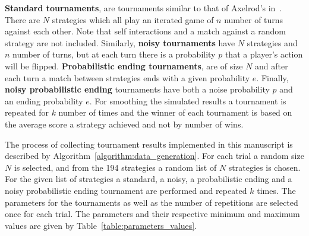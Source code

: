 \documentclass{article}
\begin{document}
\textbf{Standard tournaments}, are tournaments similar to that of Axelrod's
in~\cite{Axelrod1980a}. There are \(N\) strategies which all play an iterated
game of \(n\) number of turns against each other. Note that self interactions
and a match against a random strategy are not included. Similarly, \textbf{noisy
tournaments} have \(N\) strategies and \(n\) number of turns, but at each turn
there is a probability \(p\) that a player's action will be flipped.
\textbf{Probabilistic ending tournaments}, are of size \(N\) and after each turn
a match between strategies ends with a given probability \(e\). Finally,
\textbf{noisy probabilistic ending} tournaments have both a noise probability
\(p\) and an ending probability \(e\). For smoothing the simulated results a
tournament is repeated for \(k\) number of times and the winner of each tournament
is based on the average score a strategy achieved and not by number of wins.



The process of collecting tournament results implemented in this manuscript is described by
Algorithm~\ref{algorithm:data_generation}. For each trial a random size \(N\) is
selected, and from the 194 strategies a random list of \(N\) strategies is
chosen. For the given list of strategies a standard, a noisy, a probabilistic
ending and a noisy probabilistic ending tournament are performed and repeated
\(k\) times. The parameters for the tournaments as well as the number of
repetitions are selected once for each trial. The parameters and their
respective minimum and maximum values are given by
Table~\ref{table:parameters_values}.
\end{document}
